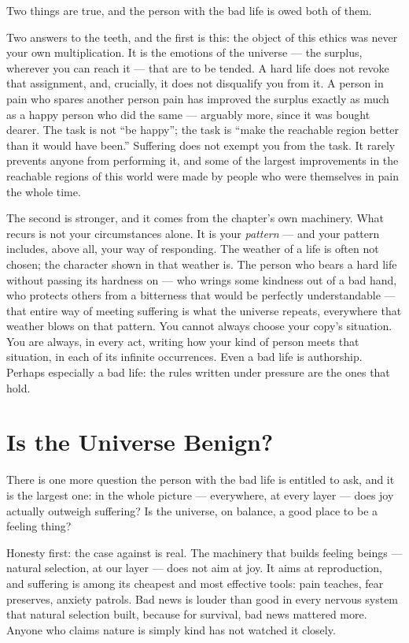 \documentclass[fontsize=11pt,paper=a4,pagesize=auto,parskip=half-]{scrbook}
\begin{document}
Two things are true, and the person with the bad life is owed both of them.

Two answers to the teeth, and the first is this: the object of this ethics was never your own multiplication. It is the emotions of the universe --- the surplus, wherever you can reach it --- that are to be tended. A hard life does not revoke that assignment, and, crucially, it does not disqualify you from it. A person in pain who spares another person pain has improved the surplus exactly as much as a happy person who did the same --- arguably more, since it was bought dearer. The task is not ``be happy''; the task is ``make the reachable region better than it would have been.'' Suffering does not exempt you from the task. It rarely prevents anyone from performing it, and some of the largest improvements in the reachable regions of this world were made by people who were themselves in pain the whole time.

The second is stronger, and it comes from the chapter's own machinery. What recurs is not your circumstances alone. It is your \emph{pattern} --- and your pattern includes, above all, your way of responding. The weather of a life is often not chosen; the character shown in that weather is. The person who bears a hard life without passing its hardness on --- who wrings some kindness out of a bad hand, who protects others from a bitterness that would be perfectly understandable --- that entire way of meeting suffering is what the universe repeats, everywhere that weather blows on that pattern. You cannot always choose your copy's situation. You are always, in every act, writing how your kind of person meets that situation, in each of its infinite occurrences. Even a bad life is authorship. Perhaps especially a bad life: the rules written under pressure are the ones that hold.

\section{Is the Universe Benign?}

There is one more question the person with the bad life is entitled to ask, and it is the largest one: in the whole picture --- everywhere, at every layer --- does joy actually outweigh suffering? Is the universe, on balance, a good place to be a feeling thing?

Honesty first: the case against is real. The machinery that builds feeling beings --- natural selection, at our layer --- does not aim at joy. It aims at reproduction, and suffering is among its cheapest and most effective tools: pain teaches, fear preserves, anxiety patrols. Bad news is louder than good in every nervous system that natural selection built, because for survival, bad news mattered more. Anyone who claims nature is simply kind has not watched it closely.
\end{document}
